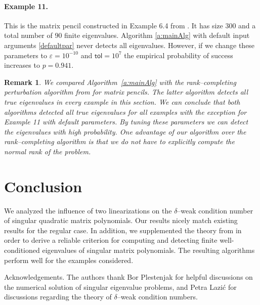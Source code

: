 \documentclass[12pt]{article}
\newtheorem{remark}[theorem]{Remark}
\begin{document}
\paragraph{Example 11.}
This is the matrix pencil constructed in Example 6.4 from \cite{hochstenbach2019solving}. It has size $300$ and a total number of $90$ finite eigenvalues. Algorithm \ref{a:mainAlg} with default input arguments \eqref{defaultpar} never detects all eigenvalues. However, if we change these parameters to $\varepsilon = 10^{-10}$ and $\mathsf{tol} = 10^7$ the empirical probability of success increases to $p=0.941$.
\begin{remark}
We compared Algorithm~\ref{a:mainAlg} with the rank--completing perturbation algorithm from \cite{hochstenbach2019solving} for matrix pencils. The latter algorithm detects all true eigenvalues in every example in this section. We can conclude that both algorithms detected all true eigenvalues for all examples with the exception for Example 11 with default parameters. By tuning these parameters we can detect the eigenvalues with high probability. One advantage of our algorithm over the rank--completing algorithm is that we do not have to explicitly compute the normal rank of the problem.
\end{remark}

\section{Conclusion}

We analyzed the influence of two linearizations on the $\delta$--weak condition number of singular quadratic matrix polynomials. Our results nicely match existing results for the regular case. In addition, we supplemented the theory from \cite{lotz2020wilkinson} in order to derive a reliable criterion for computing and detecting finite well-conditioned eigenvalues of singular matrix polynomials. The resulting algorithms perform well for the examples considered.

\begin{paragraph}{Acknowledgements.}
 The authors thank Bor Plestenjak for helpful discussions on the numerical solution of singular eigenvalue problems, and Petra Lazić for discussions regarding the theory of $\delta$--weak condition numbers.
\end{paragraph}



 
\end{document}
